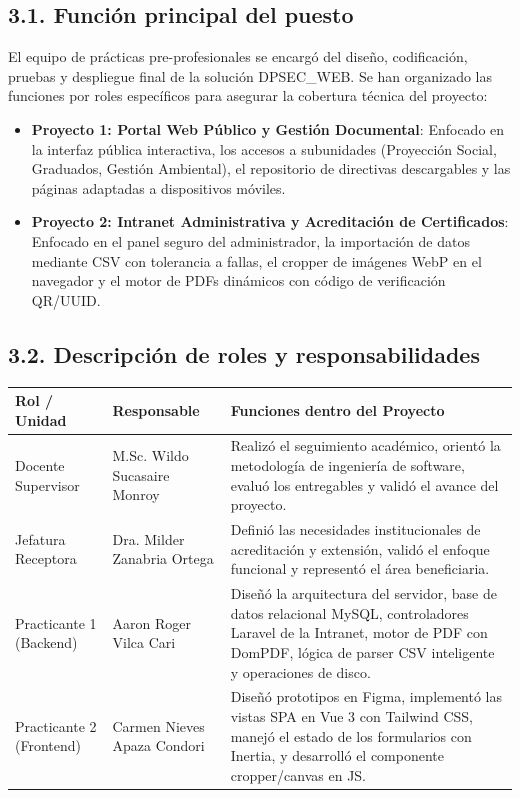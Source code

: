 \documentclass[11pt,a4paper]{article}
\begin{document}
\subsection*{3.1. Función principal del puesto}
El equipo de prácticas pre-profesionales se encargó del diseño, codificación, pruebas y despliegue final de la solución DPSEC\_WEB. Se han organizado las funciones por roles específicos para asegurar la cobertura técnica del proyecto:
\begin{itemize}
    \item \textbf{Proyecto 1: Portal Web Público y Gestión Documental}: Enfocado en la interfaz pública interactiva, los accesos a subunidades (Proyección Social, Graduados, Gestión Ambiental), el repositorio de directivas descargables y las páginas adaptadas a dispositivos móviles.
    \item \textbf{Proyecto 2: Intranet Administrativa y Acreditación de Certificados}: Enfocado en el panel seguro del administrador, la importación de datos mediante CSV con tolerancia a fallas, el cropper de imágenes WebP en el navegador y el motor de PDFs dinámicos con código de verificación QR/UUID.
\end{itemize}

\subsection*{3.2. Descripción de roles y responsabilidades}
\begin{longtable}{|p{2.8cm}|p{3.8cm}|p{7.4cm}|}
\hline
\textbf{Rol / Unidad} & \textbf{Responsable} & \textbf{Funciones dentro del Proyecto} \tabularnewline
\hline
Docente Supervisor & M.Sc. Wildo Sucasaire Monroy & Realizó el seguimiento académico, orientó la metodología de ingeniería de software, evaluó los entregables y validó el avance del proyecto. \tabularnewline
\hline
Jefatura Receptora & Dra. Milder Zanabria Ortega & Definió las necesidades institucionales de acreditación y extensión, validó el enfoque funcional y representó el área beneficiaria. \tabularnewline
\hline
Practicante 1 (Backend) & Aaron Roger Vilca Cari & Diseñó la arquitectura del servidor, base de datos relacional MySQL, controladores Laravel de la Intranet, motor de PDF con DomPDF, lógica de parser CSV inteligente y operaciones de disco. \tabularnewline
\hline
Practicante 2 (Frontend) & Carmen Nieves Apaza Condori & Diseñó prototipos en Figma, implementó las vistas SPA en Vue 3 con Tailwind CSS, manejó el estado de los formularios con Inertia, y desarrolló el componente cropper/canvas en JS. \tabularnewline
\hline
\end{longtable}
\end{document}
